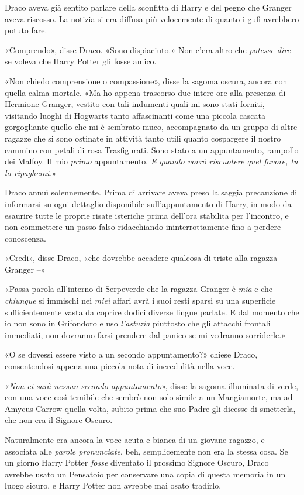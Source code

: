 Draco aveva già sentito parlare della sconfitta di Harry e del pegno che Granger aveva riscosso. La notizia si era diffusa più velocemente di quanto i gufi avrebbero potuto fare.

«Comprendo», disse Draco. «Sono dispiaciuto.» Non c’era altro che \textit{potesse dire} se voleva che Harry Potter gli fosse amico.

«Non chiedo comprensione o compassione», disse la sagoma oscura, ancora con quella calma mortale. «Ma ho appena trascorso due intere ore alla presenza di Hermione Granger, vestito con tali indumenti quali mi sono stati forniti, visitando luoghi di Hogwarts tanto affascinanti come una piccola cascata gorgogliante quello che mi è sembrato muco, accompagnato da un gruppo di altre ragazze che si sono ostinate in attività tanto utili quanto cospargere il nostro cammino con petali di rosa Trasfigurati. Sono stato a un appuntamento, rampollo dei Malfoy. Il mio \textit{primo} appuntamento. \textit{E quando vorrò riscuotere quel favore, tu lo ripagherai.}»

Draco annuì solennemente. Prima di arrivare aveva preso la saggia precauzione di informarsi su ogni dettaglio disponibile sull’appuntamento di Harry, in modo da esaurire tutte le proprie risate isteriche prima dell’ora stabilita per l’incontro, e non commettere un passo falso ridacchiando ininterrottamente fino a perdere conoscenza.

«Credi», disse Draco, «che dovrebbe accadere qualcosa di triste alla ragazza Granger –»

«Passa parola all’interno di Serpeverde che la ragazza Granger è \textit{mia} e che \textit{chiunque} si immischi nei \textit{miei} affari avrà i suoi resti sparsi su una superficie sufficientemente vasta da coprire dodici diverse lingue parlate. E dal momento che io non sono in Grifondoro e uso \textit{l’astuzia} piuttosto che gli attacchi frontali immediati, non dovranno farsi prendere dal panico se mi vedranno sorriderle.»

«O se dovessi essere visto a un secondo appuntamento?» chiese Draco, consentendosi appena una piccola nota di incredulità nella voce.

«\textit{Non ci sarà nessun secondo appuntamento}», disse la sagoma illuminata di verde, con una voce così temibile che sembrò non solo simile a un Mangiamorte, ma ad Amycus Carrow quella volta, subito prima che suo Padre gli dicesse di smetterla, che non era il Signore Oscuro.

Naturalmente era ancora la voce acuta e bianca di un giovane ragazzo, e associata alle \textit{parole pronunciate}, beh, semplicemente non era la stessa cosa. Se un giorno Harry Potter \textit{fosse} diventato il prossimo Signore Oscuro, Draco avrebbe usato un Pensatoio per conservare una copia di questa memoria in un luogo sicuro, e Harry Potter non avrebbe mai osato tradirlo.

